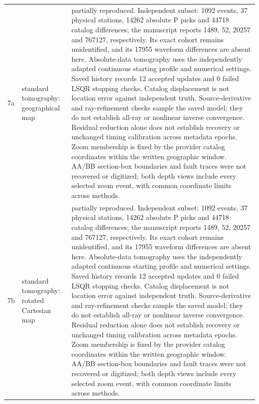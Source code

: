 \begin{longtable}{>{\raggedright\arraybackslash}p{}>{\raggedright\arraybackslash}p{}>{\raggedright\arraybackslash}p{}}
7a & standard tomography: geographical map & partially reproduced. Independent subset: 1092 events, 37 physical stations, 14262 absolute P picks and 44718 catalog differences; the manuscript reports 1489, 52, 20257 and 767127, respectively. Its exact cohort remains unidentified, and its 17955 waveform differences are absent here. Absolute-data tomography uses the independently adapted continuous starting profile and numerical settings. Saved history records 12 accepted updates and 0 failed LSQR stopping checks. Catalog displacement is not location error against independent truth. Source-derivative and ray-refinement checks sample the saved model; they do not establish all-ray or nonlinear inverse convergence. Residual reduction alone does not establish recovery or unchanged timing calibration across metadata epochs. Zoom membership is fixed by the provider catalog coordinates within the written geographic window. AA/BB section-box boundaries and fault traces were not recovered or digitized; both depth views include every selected zoom event, with common coordinate limits across methods.\\
7b & standard tomography: rotated Cartesian map & partially reproduced. Independent subset: 1092 events, 37 physical stations, 14262 absolute P picks and 44718 catalog differences; the manuscript reports 1489, 52, 20257 and 767127, respectively. Its exact cohort remains unidentified, and its 17955 waveform differences are absent here. Absolute-data tomography uses the independently adapted continuous starting profile and numerical settings. Saved history records 12 accepted updates and 0 failed LSQR stopping checks. Catalog displacement is not location error against independent truth. Source-derivative and ray-refinement checks sample the saved model; they do not establish all-ray or nonlinear inverse convergence. Residual reduction alone does not establish recovery or unchanged timing calibration across metadata epochs. Zoom membership is fixed by the provider catalog coordinates within the written geographic window. AA/BB section-box boundaries and fault traces were not recovered or digitized; both depth views include every selected zoom event, with common coordinate limits across methods.\\

\end{longtable}
